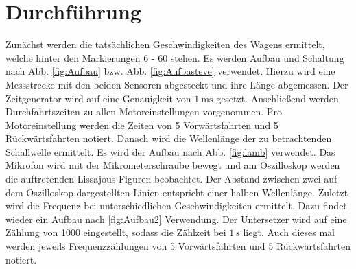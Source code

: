 
\section{Durchführung}
\label{sec:Durchführung}

\renewcommand{\labelenumi}{\alph{enumi})}
Zunächst werden die tatsächlichen Geschwindigkeiten des Wagens ermittelt, welche
 hinter den Markierungen 6 - 60 stehen. Es werden Aufbau und Schaltung nach Abb. \ref{fig:Aufbau} bzw. Abb. \ref{fig:Aufbasteve} verwendet. Hierzu wird eine Messstrecke mit den
  beiden Sensoren abgesteckt und ihre Länge abgemessen. Der Zeitgenerator wird auf eine Genauigkeit von $\SI{1}{\milli\second}$ gesetzt. Anschließend werden
   Durchfahrtszeiten zu allen Motoreinstellungen vorgenommen. Pro Motoreinstellung
    werden die Zeiten von 5 Vorwärtsfahrten und 5 Rückwärtsfahrten notiert. Danach
     wird die Wellenlänge der zu betrachtenden Schallwelle ermittelt. Es wird der Aufbau nach Abb. \ref{fig:lamb} verwendet.
      Das Mikrofon wird mit der Mikrometerschraube bewegt und am Oszilloskop werden
       die auftretenden Lissajous-Figuren beobachtet. Der Abstand zwischen zwei
        auf dem Oszilloskop dargestellten Linien entspricht einer halben Wellenlänge.
         Zuletzt wird die Frequenz bei unterschiedlichen Geschwindigkeiten ermittelt.
          Dazu findet wieder ein Aufbau nach \ref{fig:Aufbau2} Verwendung. Der
          Untersetzer wird auf eine Zählung von 1000 eingestellt, sodass die Zählzeit bei $\SI{1}{\second}$ liegt.
          Auch dieses mal werden jeweils Frequenzzählungen von 5 Vorwärtsfahrten und 5 Rückwärtsfahrten notiert.
